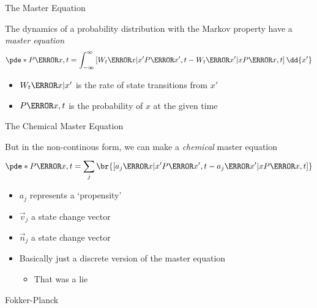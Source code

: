 \documentclass[aspectratio=169,  notheorems, sOuRcEs]{RUCPresentation}
\begin{document}
\begin{frame}{The Master Equation}


    The dynamics of a probability distribution with the Markov property
    have a \emph{master equation}
    \begin{equation} \label{eq.mastereq}
        \pde* P\of{x,t} =\int_{-\infty}^{\infty}
        \left[W_t\of{x|x'}P\of{x',t} - W_t\of{x'|x} P\of{x,t}\right]
        \dd{x'}
    \end{equation}
    \begin{itemize}
        \item  \(W_t\of{x|x'}\) is the rate of state transitions from \(x'\)
        \item  \(P\of{x, t}\) is the probability of \(x\) at the given time
    \end{itemize}

\end{frame}

\begin{frame}{The Chemical Master Equation}


    \setcounter{footnote}{1}
    But in the non-continous form, we can make a \emph{chemical}
    master equation
    \begin{equation} \label{eq.chemmastereq}
        \pde* P\of{x,t}
        =
        \sum_{j}^{}\br{
            \left[a_j\of{x|x'} P\of{x',t} - a_j\of{x'|x} P\of{x,t}\right]
        }
    \end{equation}

    \begin{itemize}
        \item \(a_j\) represents a `propensity'
        \item \(\vec{v}_j\) a state change vector
        \item \(\vec{n}_j\) a state change vector
        \item Basically just a discrete version of the master equation
            \begin{itemize}
                \item That was a lie
            \end{itemize}
    \end{itemize}

\end{frame}

\begin{frame}{Fokker-Planck}

\end{frame}
\end{document}
